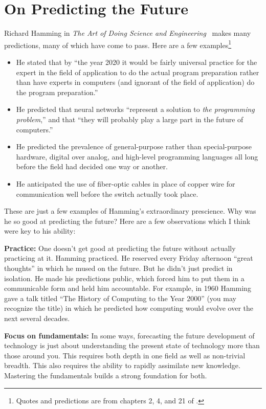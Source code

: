 \section{On Predicting the Future}
\label{sec:predicting_future}

Richard Hamming in \emph{The Art of
Doing Science and Engineering}~\citep{hamming1997art} makes many predictions,
many of which have come to pass. Here are a few examples\footnote{Quotes and
predictions are from chapters 2, 4, and 21 of \citet{hamming1997art}.}
\begin{itemize}
    \item He stated that by ``the year 2020 it would be fairly universal
        practice for the expert in the field of application to do the actual
        program preparation rather than have experts in computers (and ignorant
        of the field of application) do the program preparation.''
    \item He predicted that neural networks ``represent a solution to \emph{the
        programming problem},'' and that ``they will probably play a large part
        in the future of computers.''
    \item He predicted the prevalence of general-purpose rather than
        special-purpose hardware, digital over analog, and high-level
        programming languages all long before the field had decided one way or
        another.
    \item He anticipated the use of fiber-optic cables in place of copper wire
        for communication well before the switch actually took place.
\end{itemize}

These are just a few examples of Hamming's extraordinary prescience. Why was he
so good at predicting the future? Here are a few observations which I think
were key to his ability:

{\bf Practice:} One doesn't get good at predicting the future without actually
practicing at it. Hamming practiced. He reserved every Friday afternoon ``great
thoughts'' in which he mused on the future. But he didn't just predict in
isolation. He made his predictions public, which forced him to put them in a
communicable form and held him accountable. For example, in 1960 Hamming gave a
talk titled ``The History of Computing to the Year 2000'' (you may recognize
the title) in which he predicted how computing would evolve over the next
several decades.

{\bf Focus on fundamentals:} In some ways, forecasting the future development
of technology is just about understanding the present state of technology more
than those around you. This requires both depth in one field as well as
non-trivial breadth. This also requires the ability to rapidly assimilate new
knowledge. Mastering the fundamentals builds a strong foundation for both.

